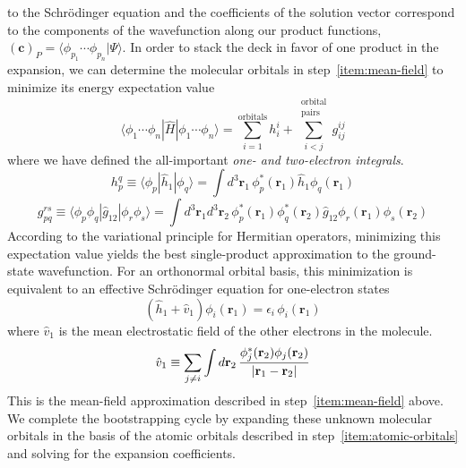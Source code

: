 to the Schr\"odinger equation and the coefficients of the solution vector
correspond to the components of the wavefunction along our product functions,
\(
    (\mathbf{c})_P
    =
    \langle \phi_{p_1}\cdots \phi_{p_n}|\Psi\rangle
\).
In order to stack the deck in favor of one product in the expansion, we can
determine the molecular orbitals in step~\ref{item:mean-field} to minimize its
energy expectation value
\begin{equation}
    \label{eq:introduction:orbital-product-expectation-value}
    \langle \phi_1\cdots \phi_n|
    \hat{H}
    |\phi_1\cdots \phi_n \rangle
    =
    \sum_{i=1}^\mathrm{orbitals}
    h_i^i
    +
    \sum_{i<j}^{\substack{\mathrm{orbital}\\\mathrm{pairs}}}
    g_{ij}^{ij}
\end{equation}
where we have defined the all-important {\itshape one- and two-electron
integrals}.
\begin{equation}
    h_p^q
    \equiv
    \langle\phi_p|\hat{h}_1|\phi_q\rangle
    =
    \int
    d^3\mathbf{r}_1\,
    \phi_p^*(\mathbf{r}_1)
    \hat{h}_1
    \phi_q(\mathbf{r}_1)
\end{equation}
\begin{equation}
    g_{pq}^{rs}
    \equiv
    \langle\phi_p\phi_q|\hat{g}_{12}|\phi_r\phi_s\rangle
    =
    \int
    d^3\mathbf{r}_1
    d^3\mathbf{r}_2\,
    \phi_p^*(\mathbf{r}_1)
    \phi_q^*(\mathbf{r}_2)
    \hat{g}_{12}
    \phi_r(\mathbf{r}_1)
    \phi_s(\mathbf{r}_2)
\end{equation}
According to the variational principle for Hermitian operators, minimizing this
expectation value yields the best single-product approximation to the
ground-state wavefunction.
For an orthonormal orbital basis, this minimization is equivalent to an
effective Schr\"odinger equation for one-electron states
\begin{equation}
    \label{eq:introduction:mean-field-orbitals}
    (
        \hat{h}_1
        +
        \hat{v}_1
    )
    \phi_i(\mathbf{r}_1)
    =
    \epsilon_i\,
    \phi_i(\mathbf{r}_1)
\end{equation}
where \(\hat{v}_1\) is the mean electrostatic field of the other electrons in
the molecule.
\begin{equation}
    \hat{v}_1
    \equiv
    \sum_{j\neq i}
    \int
    d\mathbf{r}_2\,
    \frac{%
        \phi_j^*(\mathbf{r}_2)\phi_j(\mathbf{r}_2)
    }{%
        |\mathbf{r}_1 - \mathbf{r}_2|
    }
\end{equation}
This is the mean-field approximation described in step~\ref{item:mean-field}
above.
We complete the bootstrapping cycle by expanding these unknown molecular
orbitals in the basis of the atomic orbitals described in
step~\ref{item:atomic-orbitals} and solving for the expansion coefficients.

